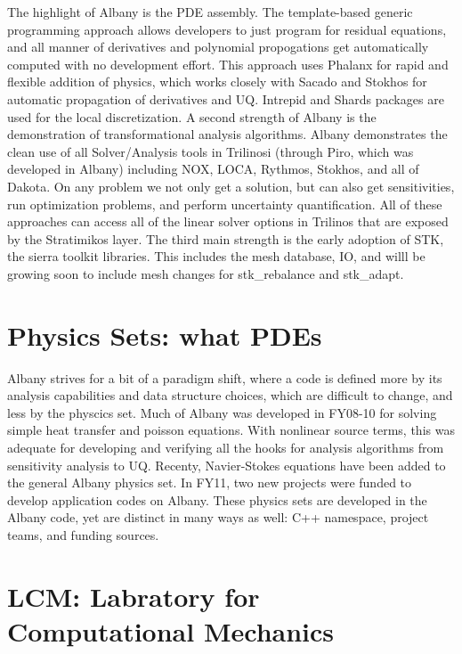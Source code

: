 \documentclass[pdf,12pt,report,strict]{SANDreport}
\theoremstyle{remark}
\begin{document}
The highlight of Albany is the PDE assembly. The template-based
generic programming approach allows developers to just program for
residual equations, and all manner of derivatives and polynomial
propogations get automatically computed with no development
effort. This approach uses Phalanx for rapid and flexible addition of
physics, which works closely with Sacado and Stokhos for automatic
propagation of derivatives and UQ. Intrepid and Shards packages are
used for the local discretization. A second strength of Albany is the
demonstration of transformational analysis algorithms. Albany
demonstrates the clean use of all Solver/Analysis tools in Trilinosi
(through Piro, which was developed in Albany) including NOX, LOCA,
Rythmos, Stokhos, and all of Dakota. On any problem we not only get a
solution, but can also get sensitivities, run optimization problems,
and perform uncertainty quantification. All of these approaches can
access all of the linear solver options in Trilinos that are exposed
by the Stratimikos layer. The third main strength is the early
adoption of STK, the sierra toolkit libraries. This includes the mesh
database, IO, and willl be growing soon to include mesh changes for
stk\_rebalance and stk\_adapt.  

\section{Physics Sets: what PDEs}

Albany strives for a bit of a paradigm shift, where a code is defined
more by its analysis capabilities and data structure choices, which
are difficult to change, and less by the physcics set. Much of Albany
was developed in FY08-10 for solving simple heat transfer and poisson
equations. With nonlinear source terms, this was adequate for
developing and verifying all the hooks for analysis algorithms from
sensitivity analysis to UQ. Recenty, Navier-Stokes equations have been
added to the general Albany physics set. In FY11, two new projects
were funded to develop application codes on Albany. These physics sets
are developed in the Albany code, yet are distinct in many ways as
well: C++ namespace, project teams, and funding sources.  

\section{LCM: Labratory for Computational Mechanics}
\end{document}
